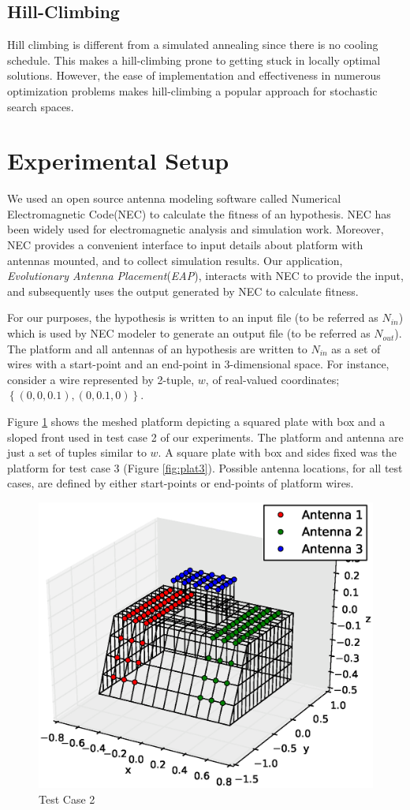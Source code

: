 \documentclass{sig-alternate}
\begin{document}
\subsection{Hill-Climbing}
\label{sec:algoriths-hc}
Hill climbing is different from a simulated annealing since there is no cooling schedule. This makes a hill-climbing prone to getting stuck in locally optimal solutions. However, the ease of implementation and effectiveness in numerous optimization problems makes hill-climbing a popular approach for stochastic search spaces.  

\section{Experimental Setup}
\label{sec:setup}
We used an open source antenna modeling software called Numerical Electromagnetic Code(NEC) to calculate the fitness of an hypothesis. NEC has been widely used for electromagnetic analysis and simulation work. Moreover, NEC provides a convenient interface to input details about platform with antennas mounted, and to collect simulation results. Our application, \textit{Evolutionary Antenna Placement}(\textit{EAP}), interacts with NEC to provide the input, and subsequently uses the output generated by NEC to calculate fitness. 

For our purposes, the hypothesis is written to an input file (to be referred as $N_{in}$) which is used by NEC modeler to generate an output file (to be referred as $N_{out}$). The platform and all antennas of an hypothesis are written to $N_{in}$ as a set of wires with a start-point and an end-point in 3-dimensional space. For instance, consider a wire represented by 2-tuple, $w$, of real-valued coordinates; $\left\{(0,0,0.1), (0,0.1,0)\right\}$. 

Figure \ref{fig:plat2} shows the meshed platform depicting a squared plate with box and a sloped front used in test case 2 of our experiments. The platform and antenna are just a set of tuples similar to $w$. A square plate with box and sides fixed was the platform for test case 3 (Figure \ref{fig:plat3}). Possible antenna locations, for all test cases, are defined by either start-points or end-points of platform wires.  
\begin{figure}
    \begin{center}
        \includegraphics[width=.41\textwidth]{FIG/tc_2_figure}
\end{center}
\caption{Test Case 2}
\label{fig:plat2}
\end{figure}
\end{document}
